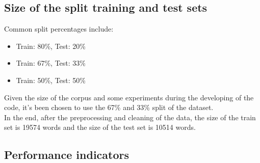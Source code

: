 \documentclass{article}
\begin{document}
        \subsection{Size of the split training and test sets}
        Common split percentages include:
            \begin{itemize}
                \item Train: 80\%, Test: 20\%
                \item Train: 67\%, Test: 33\%
                \item Train: 50\%, Test: 50\%
            \end{itemize}
            Given the size of the corpus and some experiments during the developing of the code, it's been chosen to use the 67\% and 33\% split of the dataset.\\
            In the end, after the preprocessing and cleaning of the data, the size of the train set is 19574 words and the size of the test set is 10514 words.
        
        \subsection{Performance indicators}
\end{document}
